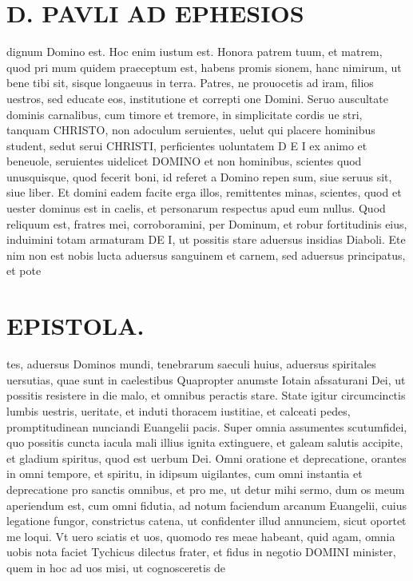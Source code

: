 \documentclass{article}
\begin{document}
\begin{pages}
\section*{D. PAVLI AD EPHESIOS }
\marginpar{[ p.]}
\marginpar{[ p.]}
\marginpar{[ p.]}
\marginpar{[ p.]}\pstart dignum Domino est. Hoc enim iustum est. Honora patrem tuum, et matrem, quod pri mum quidem praeceptum est, habens promis sionem, hanc nimirum, ut bene tibi sit, sisque longaeuus in terra.  \pend\pstart Patres, ne prouocetis ad iram, filios uestros, sed educate eos, institutione et correpti one Domini.  \pend\pstart Seruo auscultate dominis carnalibus, cum timore et tremore, in simplicitate cordis ue stri, tanquam CHRISTO, non adoculum seruientes, uelut qui placere hominibus student, sedut serui CHRISTI, perficientes uoluntatem D E I ex animo et beneuole, seruientes uidelicet DOMINO et non hominibus, scientes quod unusquisque, quod fecerit boni, id referet a Domino repen sum, siue seruus sit, siue liber.  \pend\pstart Et domini eadem facite erga illos, remittentes minas, scientes, quod et uester dominus est in caelis, et personarum respectus apud eum nullus.  \pend\pstart Quod reliquum est, fratres mei, corroboramini, per Dominum, et robur fortitudinis eius, induimini totam armaturam DE I, ut possitis stare aduersus insidias Diaboli. Ete nim non est nobis lucta aduersus sanguinem et carnem, sed aduersus principatus, et pote\pend
\section*{EPISTOLA.  }
\marginpar{[ p.10.  ]}
\marginpar{[ p.]}
\marginpar{[ p.]}
\marginpar{[ p.]}\pstart tes, aduersus Dominos mundi, tenebrarum saeculi huius, aduersus spiritales uersutias, quae sunt in caelestibus  \pend\pstart Quapropter anumste Iotain afssaturani Dei, ut possitis resistere in die malo, et omnibus peractis stare. State igitur circumcinctis lumbis uestris, ueritate, et induti thoracem iustitiae, et calceati pedes, promptitudinean nunciandi Euangelii pacis. Super omnia assumentes scutumfidei, quo possitis cuncta iacula mali illius ignita extinguere, et galeam salutis accipite, et gladium spiritus, quod est uerbum Dei.  \pend\pstart Omni oratione et deprecatione, orantes in omni tempore, et spiritu, in idipsum uigilantes, cum omni instantia et deprecatione pro sanctis omnibus, et pro me, ut detur mihi sermo, dum os meum aperiendum est, cum omni fidutia, ad notum faciendum arcanum Euangelii, cuius legatione fungor, constrictus catena, ut confidenter illud annunciem, sicut oportet me loqui.  \pend\pstart Vt uero sciatis et uos, quomodo res meae habeant, quid agam, omnia uobis nota faciet Tychicus dilectus frater, et fidus in negotio DOMINI minister, quem in hoc ad uos misi, ut cognosceretis de  \pend

\end{pages}
\end{document}
